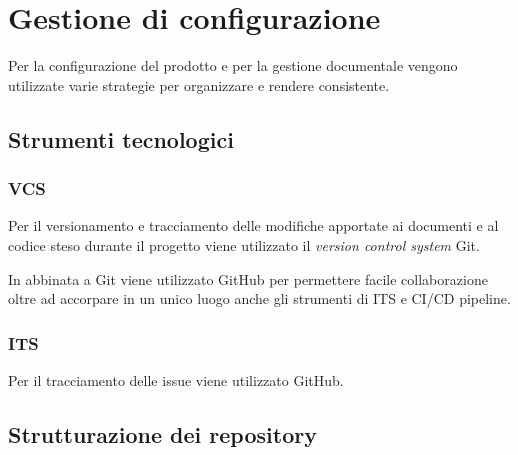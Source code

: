 \section{Gestione di configurazione}\label{s:configurazione}

Per la configurazione del prodotto e per la gestione documentale vengono utilizzate varie strategie per organizzare e rendere consistente.

\subsection{Strumenti tecnologici}

\subsubsection{VCS}\label{sss:vcs} Per il versionamento e tracciamento delle modifiche apportate ai documenti e al codice steso durante il progetto viene utilizzato il \textit{version control system} Git. 

In abbinata a Git viene utilizzato GitHub per permettere facile collaborazione oltre ad accorpare in un unico luogo anche gli strumenti di ITS e CI/CD pipeline.

\subsubsection{ITS} Per il tracciamento delle issue viene utilizzato GitHub.

\subsection{Strutturazione dei repository}
